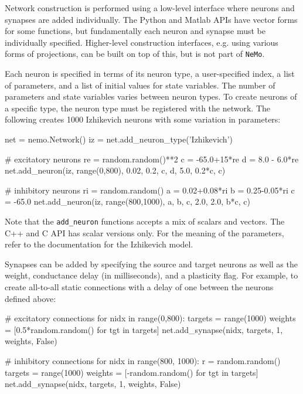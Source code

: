 \documentclass[a4paper]{article}
\newcommand{\nemo}{\texttt{NeMo}}
\newcommand{\code}[1]{\texttt{#1}}
\begin{document}
Network construction is performed using a low-level interface
	where neurons and synapses are added individually. 
The Python and Matlab APIs have vector forms for some functions,
	but fundamentally each neuron and synapse must be individually specified.
Higher-level construction interfaces,
	e.g. using various forms of projections,
	can be built on top of this,
	but is not part of \nemo.

Each neuron is specified in terms of its
	neuron type,
	a user-specified index,
	a list of parameters,
	and a list of initial values for state variables. 
The number of parameters and state variables varies between neuron types.
To create neurons of a specific type,
	the neuron type must be registered with the network.
The following creates 1000 Izhikevich neurons with some variation in parameters: 

\begin{python}
net = nemo.Network()
iz = net.add_neuron_type('Izhikevich')

# excitatory neurons
re = random.random()**2
c = -65.0+15*re
d = 8.0 - 6.0*re
net.add_neuron(iz, range(0,800), 0.02, 0.2, c, d, 5.0, 0.2*c, c)

# inhibitory neurons
ri = random.random()
a = 0.02+0.08*ri
b = 0.25-0.05*ri
c = -65.0
net.add_neuron(iz, range(800,1000), a, b, c, 2.0, 2.0, b*c, c)
\end{python}

Note that the \code{add\_neuron} functions accepts a mix of scalars and vectors.
The C++ and C API has scalar versions only.
For the meaning of the parameters, refer to the documentation for the Izhikevich model.

Synapses can be added by specifying the source and target neurons as well as
	the weight, conductance delay (in milliseconds), and a plasticity flag.
For example, to create all-to-all static connections with a delay of one
between the neurons defined above:

\begin{python}
# excitatory connections
for nidx in range(0,800):
    targets = range(1000)
    weights = [0.5*random.random() for tgt in targets]
    net.add_synapse(nidx, targets, 1, weights, False)

# inhibitory connections
for nidx in range(800, 1000):
    r = random.random()
    targets = range(1000)
    weights = [-random.random() for tgt in targets]
    net.add_synapse(nidx, targets, 1, weights, False)
\end{python}
\end{document}
